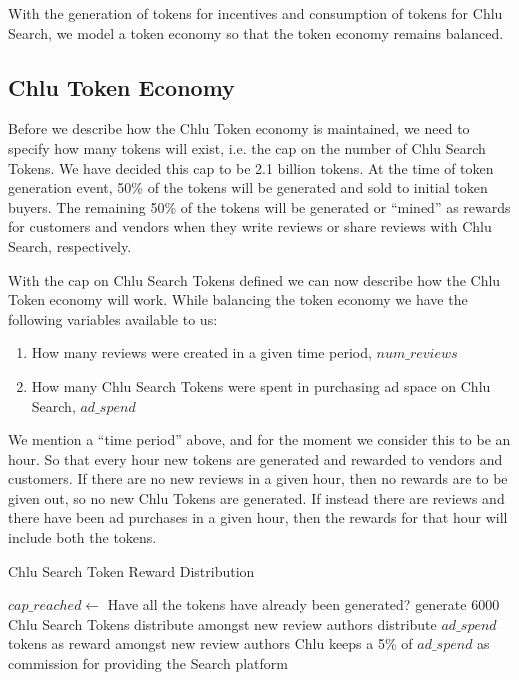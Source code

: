 \documentclass[a4paper]{article}
\begin{document}
With the generation of tokens for incentives and consumption of tokens
for Chlu Search, we model a token economy so that the token economy
remains balanced.

\subsection{Chlu Token Economy}

Before we describe how the Chlu Token economy is maintained, we need
to specify how many tokens will exist, i.e. the cap on the number of
Chlu Search Tokens. We have decided this cap to be 2.1 billion
tokens. At the time of token generation event, 50\% of the tokens will
be generated and sold to initial token buyers. The remaining 50\% of
the tokens will be generated or ``mined'' as rewards for customers and
vendors when they write reviews or share reviews with Chlu Search,
respectively.

With the cap on Chlu Search Tokens defined we can now describe how the
Chlu Token economy will work. While balancing the token economy we
have the following variables available to us:

\begin{enumerate}
\item How many reviews were created in a given time period, $num\_reviews$
\item How many Chlu Search Tokens were spent in purchasing ad space on
  Chlu Search, $ad\_spend$
\end{enumerate}

We mention a ``time period'' above, and for the moment we consider
this to be an hour. So that every hour new tokens are generated and
rewarded to vendors and customers. If there are no new reviews in a
given hour, then no rewards are to be given out, so no new Chlu Tokens
are generated. If instead there are reviews and there have been ad
purchases in a given hour, then the rewards for that hour will include
both the tokens.

\begin{algorithm}
  \caption{Chlu Search Token Reward Distribution}
  \label{reward-algo}
  \begin{algorithmic}
    \STATE $cap\_reached \leftarrow$ Have all the tokens have already been generated?
    \STATE generate $6000$ Chlu Search Tokens
    \STATE distribute amongst new review authors
    \STATE distribute $ad\_spend$ tokens as reward amongst new review authors
    \STATE Chlu keeps a 5\% of $ad\_spend$ as  commission for providing the Search platform
    \ENDIF
  \end{algorithmic}    
\end{algorithm}
\end{document}
